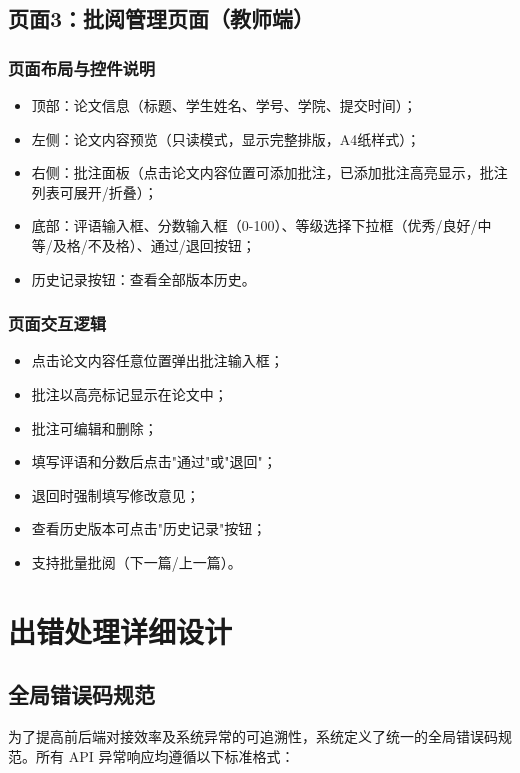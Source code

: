 \documentclass{../template/softeng}
\begin{document}
	\subsection{页面3：批阅管理页面（教师端）}

	\subsubsection{页面布局与控件说明}
	\begin{itemize}
		\item 顶部：论文信息（标题、学生姓名、学号、学院、提交时间）；
		\item 左侧：论文内容预览（只读模式，显示完整排版，A4纸样式）；
		\item 右侧：批注面板（点击论文内容位置可添加批注，已添加批注高亮显示，批注列表可展开/折叠）；
		\item 底部：评语输入框、分数输入框（0-100）、等级选择下拉框（优秀/良好/中等/及格/不及格）、通过/退回按钮；
		\item 历史记录按钮：查看全部版本历史。
	\end{itemize}

	\subsubsection{页面交互逻辑}
	\begin{itemize}
		\item 点击论文内容任意位置弹出批注输入框；
		\item 批注以高亮标记显示在论文中；
		\item 批注可编辑和删除；
		\item 填写评语和分数后点击"通过"或"退回"；
		\item 退回时强制填写修改意见；
		\item 查看历史版本可点击"历史记录"按钮；
		\item 支持批量批阅（下一篇/上一篇）。
	\end{itemize}



    \section{出错处理详细设计}

\subsection{全局错误码规范}
为了提高前后端对接效率及系统异常的可追溯性，系统定义了统一的全局错误码规范。所有 API 异常响应均遵循以下标准格式：
\end{document}
